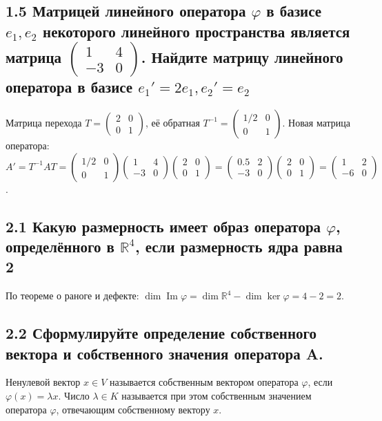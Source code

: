 \documentclass{article}
\begin{document}
\subsection*{1.5 Матрицей линейного оператора \( \varphi \) в базисе \( e_1, e_2 \) некоторого линейного пространства является матрица \( \begin{pmatrix} 1 & 4 \\ -3 & 0 \end{pmatrix} \). Найдите матрицу линейного оператора в базисе \( e_1' = 2e_1, e_2' = e_2 \)}
Матрица перехода \( T = \begin{pmatrix} 2 & 0 \\ 0 & 1 \end{pmatrix} \), её обратная \( T^{-1} = \begin{pmatrix} 1/2 & 0 \\ 0 & 1 \end{pmatrix} \).
Новая матрица оператора: \( A' = T^{-1} A T = \begin{pmatrix} 1/2 & 0 \\ 0 & 1 \end{pmatrix} \begin{pmatrix} 1 & 4 \\ -3 & 0 \end{pmatrix} \begin{pmatrix} 2 & 0 \\ 0 & 1 \end{pmatrix} = \begin{pmatrix} 0.5 & 2 \\ -3 & 0 \end{pmatrix} \begin{pmatrix} 2 & 0 \\ 0 & 1 \end{pmatrix} = \begin{pmatrix} 1 & 2 \\ -6 & 0 \end{pmatrix} \).

\subsection*{2.1 Какую размерность имеет образ оператора \( \varphi \), определённого в \( \mathbb{R}^4 \), если размерность ядра равна 2}
По теореме о раноге и дефекте: \(\dim \operatorname{Im} \varphi = \dim \mathbb{R}^4 - \dim \ker \varphi = 4 - 2 = 2\).

\subsection*{2.2 Сформулируйте определение собственного вектора и собственного значения оператора A.}
Ненулевой вектор \( x \in V \) называется собственным вектором оператора \( \varphi \), если \( \varphi(x) = \lambda x \). Число \( \lambda \in K \) называется при этом собственным значением оператора \( \varphi \), отвечающим собственному вектору \( x \).
\end{document}
